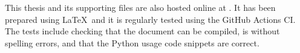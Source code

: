 \begin{table}[tbhp]
    \centering%
    \resizebox{\textwidth}{!}{%
    }\caption{%
        A summary of the repositories and archives associated with the chapters
        of this thesis%
    }\label{tab:repos}
\end{table}

This thesis and its supporting files are also hosted online at
. It has been prepared using \LaTeX\ and it is
regularly tested using the GitHub Actions CI. The tests include checking that
the document can be compiled, is without spelling errors, and that the Python
usage code snippets are correct.
